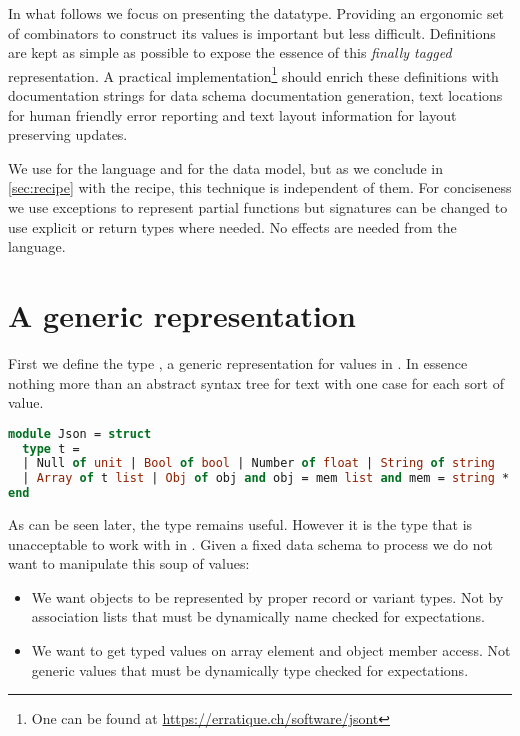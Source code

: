\documentclass[nolinenum]{jfp}
\begin{document}
In what follows we focus on presenting the datatype. Providing an
ergonomic set of combinators to construct its values is important but
less difficult. Definitions
are kept as simple as possible to expose the essence of this
\emph{finally tagged} representation. A practical
implementation\footnote{One can be found at
\url{https://erratique.ch/software/jsont}} should enrich these
definitions with documentation strings for data schema documentation
generation, text locations for human friendly error reporting and
text layout information for layout preserving updates.

We use \ocaml{} \citep{ocaml} for the \ml{} language and \json{}
\citep{json} for the data model, but as we conclude in
\autoref{sec:recipe} with the recipe, this technique is independent of
them. For conciseness we use exceptions to represent partial functions
but signatures can be changed to use explicit  or
 return types where needed. No effects are needed from
the \ml{} language.

\section{A generic representation}
\label{sec:genrep}

First we define the type , a generic representation for
\json{} values in \ml{}. In essence nothing more than an abstract
syntax tree for \json{} text with one case for each sort of value.

\begin{lstlisting}[language=ocaml]
module Json = struct
  type t =
  | Null of unit | Bool of bool | Number of float | String of string
  | Array of t list | Obj of obj and obj = mem list and mem = string * t
end
\end{lstlisting}

As can be seen later, the type  remains useful. However it is
the type that is unacceptable to work with in \ml{}. Given a fixed
data schema to process we do not want to manipulate this soup of
values:

\begin{itemize}
\item We want objects to be represented by proper record or variant types.
  Not by  association lists that must be dynamically name
  checked for expectations.
\item We want to get typed values on array element and object
  member access. Not generic  values that must be dynamically
  type checked for expectations.
\end{itemize}
\end{document}
